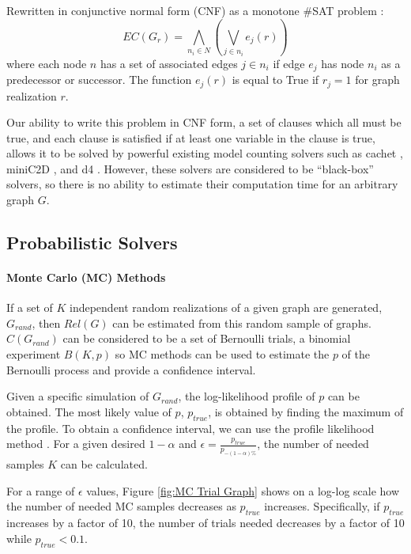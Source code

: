 Rewritten in conjunctive normal form (CNF) as a monotone \#SAT problem \cite{roth1996hardness} \cite{vaisman2015model}: \[EC(G_r) = \bigwedge_{n_i \in N} (\bigvee_{j \in n_i} e_j(r))\] where each node \(n\) has a set of associated edges \(j \in n_i\) if edge \(e_j\) has node \(n_i\) as a predecessor or successor. The function \(e_j(r)\) is equal to True if \(r_j=1\) for graph realization \(r\).

Our ability to write this problem in CNF form, a set of clauses which all must be true, and each clause is satisfied if at least one variable in the clause is true, allows it to be solved by powerful existing model counting solvers such as cachet \cite{sang2005heuristics}, miniC2D \cite{oztok2015top}, and d4 \cite{lagniez2017improved}. However, these solvers are considered to be ``black-box'' solvers, so there is no ability to estimate their computation time for an arbitrary graph \(G\).

\hypertarget{probabilistic-solvers}{%
\subsection{Probabilistic Solvers}\label{probabilistic-solvers}}

\hypertarget{monte-carlo-mc-methods}{%
\paragraph{\texorpdfstring{Monte Carlo (MC) Methods\\
}{Monte Carlo (MC) Methods }}\label{monte-carlo-mc-methods}}

If a set of \(K\) independent random realizations of a given graph are generated, \(G_{rand}\), then \(Rel(G)\) can be estimated from this random sample of graphs. \(C(G_{rand})\) can be considered to be a set of Bernoulli trials, a binomial experiment \(B(K,p)\) so MC methods can be used to estimate the \(p\) of the Bernoulli process and provide a confidence interval.

Given a specific simulation of \(G_{rand}\), the log-likelihood profile of \(p\) can be obtained. The most likely value of \(p\), \(p_{true}\), is obtained by finding the maximum of the profile. To obtain a confidence interval, we can use the profile likelihood method \cite{venzon1988method}. For a given desired \(1-\alpha\) and \(\epsilon=\frac{p_{true}}{p_{-(1-\alpha)\%}}\), the number of needed samples \(K\) can be calculated.

For a range of \(\epsilon\) values, Figure \ref{fig:MC Trial Graph} shows on a log-log scale how the number of needed MC samples decreases as \(p_{true}\) increases. Specifically, if \(p_{true}\) increases by a factor of 10, the number of trials needed decreases by a factor of 10 while \(p_{true}<0.1\).

